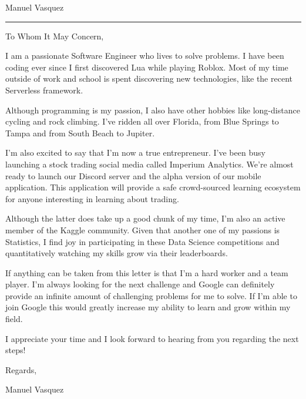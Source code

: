 \documentclass{article}
\newcommand{\position}{I am writing to apply for the \_ position.}
\newcommand{\company}{Google }
\newcommand{\name}{Manuel Vasquez}
\begin{document}
\begin{minipage}[t]{.69\linewidth}
    \begin{center}
        \Huge \name
    \end{center}
    \vspace*{1.89cm}
    \hrule
    \vspace*{.49cm}

    To Whom It May Concern,
    \vspace*{.49cm}


    I am a passionate Software Engineer who lives to solve problems. I have been coding ever since I first discovered Lua while playing Roblox. Most of my time outside of work and school is spent discovering new technologies, like the recent Serverless framework.
    \vspace*{.49cm}

    Although programming is my passion, I also have other hobbies like long-distance cycling and rock climbing. I've ridden all over Florida, from Blue Springs to Tampa and from South Beach to Jupiter.
    \vspace*{.49cm}

    I'm also excited to say that I'm now a true entrepreneur. I've been busy launching a stock trading social media called Imperium Analytics. We're almost ready to launch our Discord server and the alpha version of our mobile application. This application will provide a safe crowd-sourced learning ecosystem for anyone interesting in learning about trading.
    \vspace*{.49cm}

    Although the latter does take up a good chunk of my time, I'm also an active member of the Kaggle community. Given that another one of my passions is Statistics, I find joy in participating in these Data Science competitions and quantitatively watching my skills grow via their leaderboards.
    \vspace*{.49cm}

    If anything can be taken from this letter is that I'm a hard worker and a team player. I'm always looking for the next challenge and \company can definitely provide an infinite amount of challenging problems for me to solve. If I'm able to join \company this would greatly increase my ability to learn and grow within my field.
    \vspace*{.49cm}

    I appreciate your time and I look forward to hearing from you regarding the next steps!
    \vspace*{.49cm}

    Regards,
    \vspace*{.49cm}

    \name
\end{minipage}
\end{document}
